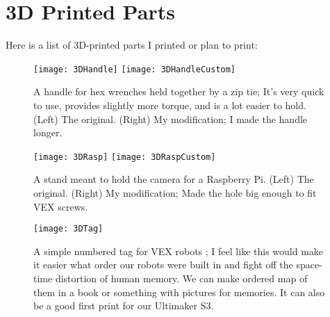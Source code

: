 \section{3D Printed Parts}
Here is a list of 3D-printed parts I printed or plan to print:

\begin{figure}[h]
    \centering
    \texttt{[image: 3DHandle]}
    \texttt{[image: 3DHandleCustom]}
    \caption{
        A handle for hex wrenches held together by a zip tie; It's very quick to use, provides slightly more torque, and is a lot easier to hold. (Left) The original. \cite{3DHandle} (Right) My modification; I made the handle longer.
    }
\end{figure}


\begin{figure}[h]
    \centering
    \texttt{[image: 3DRasp]}
    \texttt{[image: 3DRaspCustom]}
    \caption{
        A stand meant to hold the camera for a Raspberry Pi. (Left) The original. \cite{3DRasp} (Right) My modification; Made the hole big enough to fit VEX screws.
    }
\end{figure}

\begin{figure}[h]
    \centering
    \texttt{[image: 3DTag]}
    \caption{
        A simple numbered tag for VEX robots \cite{3DTag}; I feel like this would make it easier what order our robots were built in and fight off the space-time distortion of human memory. We can make ordered map of them in a book or something with pictures for memories. It can also be a good first print for our Ultimaker S3.
    }
\end{figure}
